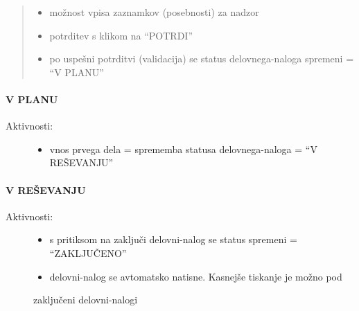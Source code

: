 \documentclass[letterpaper,10pt,english]{sphinxmanual}
\begin{document}
\begin{quote}
\begin{description}
\begin{itemize}
\begin{description}
\begin{itemize}
\end{itemize}

\end{description}

\item {} 
možnost vpisa zaznamkov (posebnosti) za nadzor

\item {} 
potrditev s klikom na ``POTRDI''

\item {} 
po uspešni potrditvi (validacija) se status delovnega-naloga spremeni = ``V PLANU''

\end{itemize}

\end{description}
\end{quote}


\paragraph{V PLANU}
\label{view_za_izvajalca:v-planu}\begin{description}
\item[{Aktivnosti:}] \leavevmode\begin{itemize}
\item {} 
vnos prvega dela = sprememba statusa delovnega-naloga = ``V REŠEVANJU''

\end{itemize}

\end{description}


\paragraph{V REŠEVANJU}
\label{view_za_izvajalca:v-resevanju}\begin{description}
\item[{Aktivnosti:}] \leavevmode\begin{itemize}
\item {} 
s pritiksom na zaključi delovni-nalog se status spremeni = ``ZAKLJUČENO''

\item {} 
delovni-nalog se avtomatsko natisne. Kasnejše tiskanje je možno pod

\end{itemize}

zaključeni delovni-nalogi

\end{description}
\end{document}

